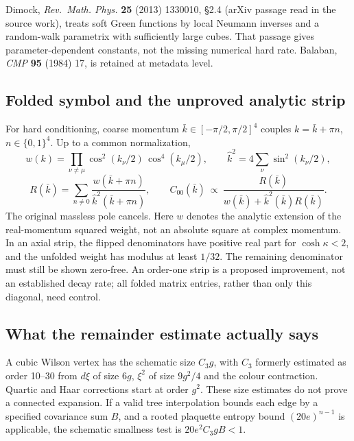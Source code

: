 \documentclass[11pt,a4paper]{article}
\begin{document}
Dimock, \emph{Rev.~Math. Phys.} \textbf{25} (2013) 1330010, §2.4 (arXiv
passage read in the source work), treats soft Green functions by local
Neumann inverses and a random-walk parametrix with sufficiently large
cubes. That passage gives parameter-dependent constants, not the missing
numerical hard rate. Balaban, \emph{CMP} \textbf{95} (1984) 17, is
retained at metadata level.

\hypertarget{folded-symbol-and-the-unproved-analytic-strip}{%
\subsection{Folded symbol and the unproved analytic
strip}\label{folded-symbol-and-the-unproved-analytic-strip}}

For hard conditioning, coarse momentum \(\bar k\in[-\pi/2,\pi/2]^4\)
couples \(k=\bar k+\pi n\), \(n\in\{0,1\}^4\). Up to a common
normalization,
\[w(k)=\prod_{\nu\ne\mu}\cos^2(k_\nu/2)\,\cos^4(k_\mu/2),\qquad
 \hat k^2=4\sum_\nu\sin^2(k_\nu/2),\]
\[R(\bar k)=\sum_{n\ne0}\frac{w(\bar k+\pi n)}{\hat k^2(\bar k+\pi n)},
\qquad C_{00}(\bar k)\ \propto\
 \frac{R(\bar k)}{w(\bar k)+\hat k^2(\bar k)R(\bar k)}.\] The original
massless pole cancels. Here \(w\) denotes the analytic extension of the
real-momentum squared weight, not an absolute square at complex
momentum. In an axial strip, the flipped denominators have positive real
part for \(\cosh\kappa<2\), and the unfolded weight has modulus at least
\(1/32\). The remaining denominator must still be shown zero-free. An
order-one strip is a proposed improvement, not an established decay
rate; all folded matrix entries, rather than only this diagonal, need
control.

\hypertarget{what-the-remainder-estimate-actually-says}{%
\subsection{What the remainder estimate actually
says}\label{what-the-remainder-estimate-actually-says}}

A cubic Wilson vertex has the schematic size \(C_3g\), with \(C_3\)
formerly estimated as order 10--30 from \(d\xi\) of size \(6g\),
\(\xi^2\) of size \(9g^2/4\) and the colour contraction. Quartic and
Haar corrections start at order \(g^2\). These size estimates do not
prove a connected expansion. If a valid tree interpolation bounds each
edge by a specified covariance sum \(B\), and a rooted plaquette entropy
bound \((20e)^{n-1}\) is applicable, the schematic smallness test is
\(20e^2C_3gB<1\).
\end{document}
